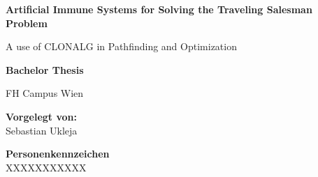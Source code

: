 \begin{center}

\vspace{1.3cm}

\hspace*{-1.0cm} {\Large \textbf{Artificial Immune Systems for Solving the Traveling Salesman Problem\\}}

\hspace*{-1.0cm} A use of CLONALG in Pathfinding and Optimization \\

\vspace{2.2cm}

\hspace*{-1.0cm} \textbf{Bachelor Thesis\\}

\vspace{0.65cm}

\hspace*{-1.0cm} FH Campus Wien \\





\vspace{5cm}

\hspace*{-1.0cm} \textbf{Vorgelegt von:} \\
\hspace*{-1.0cm} Sebastian Ukleja \\

\vspace{0.65cm}

\hspace*{-1.0cm} \textbf{Personenkennzeichen}\\
\hspace*{-1.0cm} XXXXXXXXXXX \\



\end{center}
